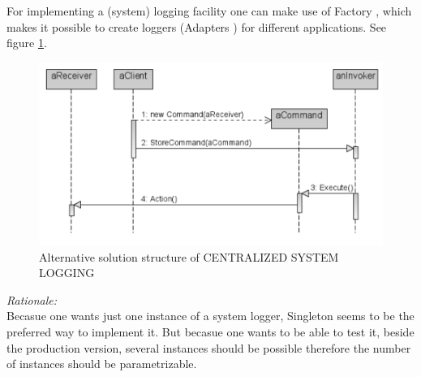For implementing a (system) logging facility one can make use of {\sc  Factory} \cite{Gamma95}, which makes it possible to create loggers ({\sc  Adapters} \cite{Gamma95}) for different applications. See figure \ref{fig:systemLogging}. 
\begin{figure}[h]
\centering
\includegraphics{patterns/systemLoggingDiagram-01.pdf}
\caption{Alternative solution structure of CENTRALIZED SYSTEM LOGGING}
\label{fig:systemLogging}
\end{figure}


\pagebreak[4]
\begin{center}
   
\end{center}

\textit{Rationale:}\\
Becasue one wants just one instance of a system logger, {\sc  Singleton} \cite{Gamma95} seems to be the preferred way to implement it. But becasue one wants to be able to test  it, beside the production version, several instances should be possible therefore the number of instances should be parametrizable.\\

